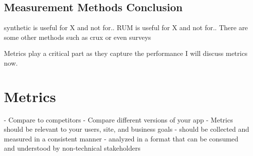 \subsection{Measurement Methods Conclusion}

synthetic is useful for X and not for..
RUM is useful for X and not for..
There are some other methods such as crux or even surveys

Metrics play a critical part as they capture the performance
I will discuss metrics now.









\section{Metrics}
















- Compare to competitors
- Compare different versions of your app
- Metrics should be relevant to your users, site, and business goals
- should be collected and measured in a consistent manner
- analyzed in a format that can be consumed and understood by non-technical stakeholders




